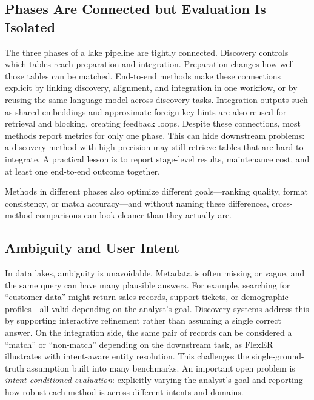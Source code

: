 \documentclass[sigconf]{acmart}
\begin{document}
\subsection{Phases Are Connected but Evaluation Is Isolated}
The three phases of a lake pipeline are tightly connected. Discovery controls which tables reach preparation and integration. Preparation changes how well those tables can be matched. End-to-end methods make these connections explicit by linking discovery, alignment, and integration in one workflow, or by reusing the same language model across discovery tasks. Integration outputs such as shared embeddings and approximate foreign-key hints are also reused for retrieval and blocking, creating feedback loops. Despite these connections, most methods report metrics for only one phase. This can hide downstream problems: a discovery method with high precision may still retrieve tables that are hard to integrate. A practical lesson is to report stage-level results, maintenance cost, and at least one end-to-end outcome together.

Methods in different phases also optimize different goals---ranking quality, format consistency, or match accuracy---and without naming these differences, cross-method comparisons can look cleaner than they actually are.

\subsection{Ambiguity and User Intent}
In data lakes, ambiguity is unavoidable. Metadata is often missing or vague, and the same query can have many plausible answers. For example, searching for ``customer data'' might return sales records, support tickets, or demographic profiles---all valid depending on the analyst's goal. Discovery systems address this by supporting interactive refinement rather than assuming a single correct answer. On the integration side, the same pair of records can be considered a ``match'' or ``non-match'' depending on the downstream task, as FlexER illustrates with intent-aware entity resolution. This challenges the single-ground-truth assumption built into many benchmarks. An important open problem is \emph{intent-conditioned evaluation}: explicitly varying the analyst's goal and reporting how robust each method is across different intents and domains.
\end{document}
